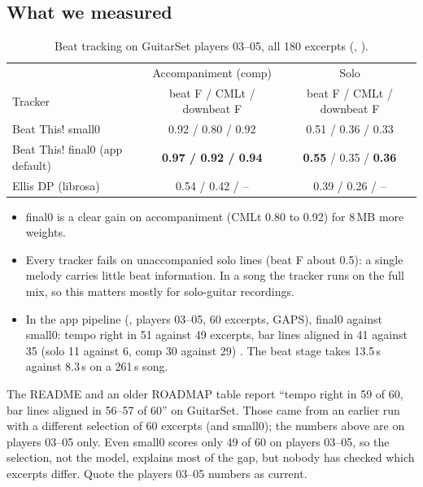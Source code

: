 \subsection{What we measured}

\begin{table}[h]
\centering
\caption{Beat tracking on GuitarSet players 03--05, all 180 excerpts
\measured{} (, ).}
\label{tab:bench-beats}
\small
\begin{tabular}{@{}lcc@{}}
\toprule
 & Accompaniment (comp) & Solo \\
Tracker & beat F / CMLt / downbeat F & beat F / CMLt / downbeat F \\
\midrule
Beat This! small0 & 0.92 / 0.80 / 0.92 & 0.51 / 0.36 / 0.33 \\
Beat This! final0 (app default) & \textbf{0.97 / 0.92 / 0.94} & \textbf{0.55} / 0.35 / \textbf{0.36} \\
Ellis DP (librosa) & 0.54 / 0.42 / -- & 0.39 / 0.26 / -- \\
\bottomrule
\end{tabular}
\end{table}

\begin{itemize}
\item final0 is a clear gain on accompaniment (CMLt 0.80 to 0.92) for 8\,MB more
  weights.
\item Every tracker fails on unaccompanied solo lines (beat F about 0.5): a
  single melody carries little beat information. In a song the tracker runs on
  the full mix, so this matters mostly for solo-guitar recordings.
\item In the app pipeline (, players 03--05, 60 excerpts,
  GAPS), final0 against small0: tempo right in 51 against 49 excerpts, bar lines
  aligned in 41 against 35 (solo 11 against 6, comp 30 against 29) \measured.
  The beat stage takes 13.5\,s against 8.3\,s on a 261\,s song.
\end{itemize}

\begin{caution}
The README and an older ROADMAP table report ``tempo right in 59 of 60, bar
lines aligned in 56--57 of 60'' on GuitarSet. Those came from an earlier run
with a different selection of 60 excerpts (and small0); the numbers above are
on players 03--05 only. Even small0 scores only 49 of 60 on players 03--05, so
the selection, not the model, explains most of the gap, but nobody has checked
which excerpts differ. Quote the players 03--05 numbers as current.
\end{caution}

